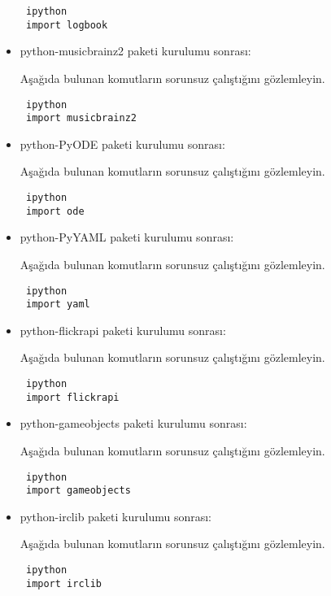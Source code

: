 \documentclass[a4paper,10pt]{article}
\begin{document}
\begin{itemize}
\begin{verbatim}
 ipython
 import logbook
\end{verbatim}

\item python-musicbrainz2 paketi kurulumu sonrası:

Aşağıda bulunan komutların sorunsuz çalıştığını gözlemleyin.

\begin{verbatim}
 ipython
 import musicbrainz2
\end{verbatim}

\item python-PyODE paketi kurulumu sonrası:

Aşağıda bulunan komutların sorunsuz çalıştığını gözlemleyin.

\begin{verbatim}
 ipython
 import ode
\end{verbatim}

\item python-PyYAML paketi kurulumu sonrası:

Aşağıda bulunan komutların sorunsuz çalıştığını gözlemleyin.

\begin{verbatim}
 ipython
 import yaml
\end{verbatim}

\item python-flickrapi paketi kurulumu sonrası:

Aşağıda bulunan komutların sorunsuz çalıştığını gözlemleyin.

\begin{verbatim}
 ipython
 import flickrapi
\end{verbatim}

\item python-gameobjects paketi kurulumu sonrası:

Aşağıda bulunan komutların sorunsuz çalıştığını gözlemleyin.

\begin{verbatim}
 ipython
 import gameobjects
\end{verbatim}

\item python-irclib paketi kurulumu sonrası:

Aşağıda bulunan komutların sorunsuz çalıştığını gözlemleyin.

\begin{verbatim}
 ipython
 import irclib
\end{verbatim}


\end{itemize}
\end{document}
